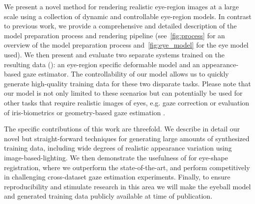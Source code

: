 


We present a novel method for rendering realistic eye-region images at a large scale using a collection of dynamic and controllable eye-region models.
In contrast to previous work, we provide a comprehensive and detailed description of the model preparation process and rendering pipeline (see~\autoref{fig:process} for an overview of the model preparation process and~\autoref{fig:eye_model} for the eye model used).
We then present and evaluate two separate systems trained on the resulting data (\emph{\dataset}): an eye-region specific deformable model and an appearance-based gaze estimator.
The controllability of our model allows us to quickly generate high-quality training data for these two disparate tasks.
Please note that our model is not only limited to these scenarios but can potentially be used for other tasks that require realistic images of eyes, e.g. gaze correction or evaluation of iris-biometrics or geometry-based gaze estimation \cite{swirski2014rendering}.

The specific contributions of this work are threefold.
%
We describe in detail our novel but straight-forward techniques for generating large amounts of synthesized training data, including wide degrees of realistic appearance variation using image-based-lighting.
%
We then demonstrate the usefulness of \dataset for eye-shape registration, where we outperform the state-of-the-art, and perform competitively in challenging cross-dataset gaze estimation experiments.
%
Finally, to ensure reproducibility and stimulate research in this area we will make the eyeball model and generated training data publicly available at time of publication.